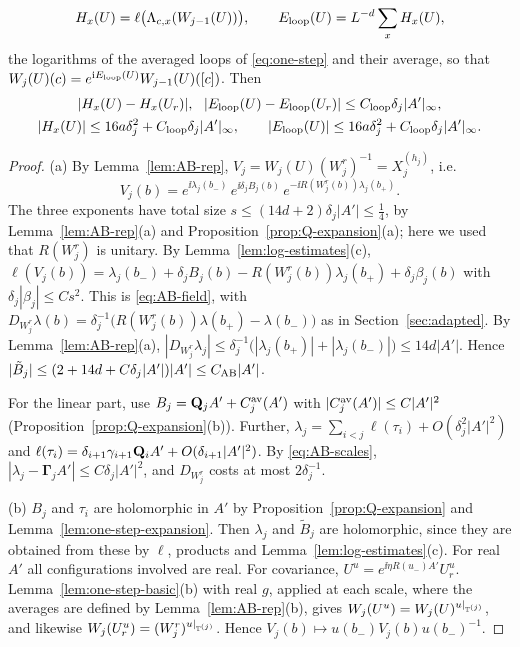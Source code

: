\begin{lemma}
\begin{enumerate}[label=(\alph*)]
\[
H_x(U)=\ell\big(\Lambda_{c,x}(W_{j-1}(U))\big),\qquad E_{\rm loop}(U)=L^{-d}\sum_xH_x(U),
\]
the logarithms of the averaged loops of \eqref{eq:one-step} and their average, so that $W_j(U)(c)=e^{\mathrm i E_{\rm loop}(U)}W_{j-1}(U)([c])$. Then
\begin{gather*}
|H_x(U)-H_x(U_r)|,\ \ |E_{\rm loop}(U)-E_{\rm loop}(U_r)|\le C_{\rm loop}\delta_j|A'|_\infty,\\
|H_x(U)|\le16a\delta_j^2+C_{\rm loop}\delta_j|A'|_\infty,\qquad|E_{\rm loop}(U)|\le16a\delta_j^2+C_{\rm loop}\delta_j|A'|_\infty .
\end{gather*}
\end{enumerate}
\end{lemma}

\begin{proof}
(a) By Lemma~\ref{lem:AB-rep}, $V_j=W_j(U)(W^r_j)^{-1}=X_j^{(h_j)}$, i.e.
\[
V_j(b)=e^{\ii\lambda_j(b_-)}\,e^{\ii\delta_jB_j(b)}\,e^{-\ii R(W^r_j(b))\lambda_j(b_+)} .
\]
The three exponents have total size $s\le(14d+2)\delta_j|A'|\le\frac14$, by Lemma~\ref{lem:AB-rep}(a) and Proposition~\ref{prop:Q-expansion}(a); here we used that $R(W^r_j)$ is unitary. By Lemma~\ref{lem:log-estimates}(c), $\ell(V_j(b))=\lambda_j(b_-)+\delta_jB_j(b)-R(W^r_j(b))\lambda_j(b_+)+\delta_j\beta_j(b)$ with $\delta_j|\beta_j|\le Cs^2$. This is \eqref{eq:AB-field}, with $D_{W^r_j}\lambda(b)=\delta_j^{-1}\big(R(W^r_j(b))\lambda(b_+)-\lambda(b_-)\big)$ as in Section~\ref{sec:adapted}. By Lemma~\ref{lem:AB-rep}(a), $|D_{W^r_j}\lambda_j|\le\delta_j^{-1}\big(|\lambda_j(b_+)|+|\lambda_j(b_-)|\big)\le14d|A'|$. Hence $|\tilde B_j|\le(2+14d+C\delta_j|A'|)|A'|\le C_{\rm AB}|A'|$.

For the linear part, use $B_j=\mathbf Q_jA'+C^{\rm av}_j(A')$ with $|C^{\rm av}_j(A')|\le C|A'|^2$ (Proposition~\ref{prop:Q-expansion}(b)). Further, $\lambda_j=\sum_{i<j}\ell(\tau_i)+O(\delta_j^2|A'|^2)$ and $\ell(\tau_i)=\delta_{i+1}\gamma_{i+1}\mathbf Q_iA'+O(\delta_{i+1}|A'|^2)$. By \eqref{eq:AB-scales}, $|\lambda_j-\boldsymbol\Gamma_jA'|\le C\delta_j|A'|^2$, and $D_{W^r_j}$ costs at most $2\delta_j^{-1}$.

(b) $B_j$ and $\tau_i$ are holomorphic in $A'$ by Proposition~\ref{prop:Q-expansion} and Lemma~\ref{lem:one-step-expansion}. Then $\lambda_j$ and $\tilde B_j$ are holomorphic, since they are obtained from these by $\ell$, products and Lemma~\ref{lem:log-estimates}(c). For real $A'$ all configurations involved are real. For covariance, $U^u=e^{\ii\eta R(u_-)A'}U_r^u$. Lemma~\ref{lem:one-step-basic}(b) with real $g$, applied at each scale, where the averages are defined by Lemma~\ref{lem:AB-rep}(b), gives $W_j(U^u)=W_j(U)^{u|_{\mathbb T^{(j)}}}$, and likewise $W_j(U_r^u)=(W^r_j)^{u|_{\mathbb T^{(j)}}}$. Hence $V_j(b)\mapsto u(b_-)V_j(b)u(b_-)^{-1}$.


\end{proof}
